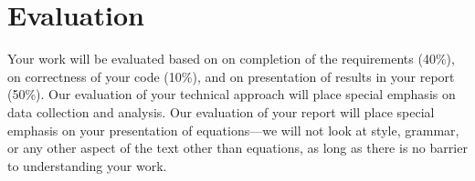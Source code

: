 \documentclass[12pt]{article}
\begin{document}
\section{Evaluation}

Your work will be evaluated based on on completion of the requirements (40\%), on correctness of your code (10\%), and on presentation of results in your report (50\%). Our evaluation of your technical approach will place special emphasis on data collection and analysis. Our evaluation of your report will place special emphasis on your presentation of equations---we will not look at style, grammar, or any other aspect of the text other than equations, as long as there is no barrier to understanding your work.




\end{document}
